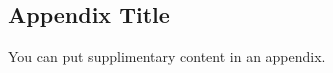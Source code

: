 \documentclass[etd,oneside,senior]{BYUPhys}
\begin{document}
\begin{appendices}

\chapter{Appendix Title}
\label{sec:appendixname}

You can put supplimentary content in an appendix.

\end{appendices}

 

 \printindex
\end{document}
